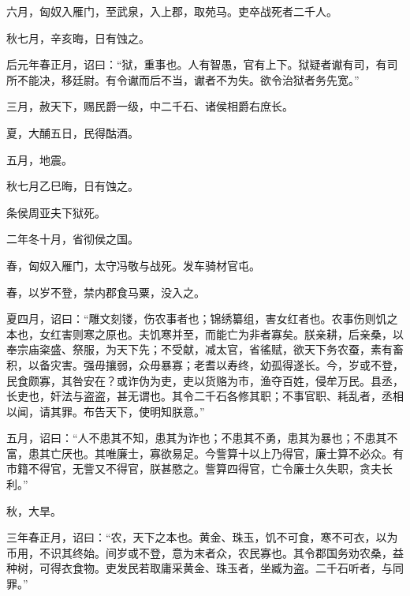 \documentclass[12pt,UTF8]{ctexbook}
\begin{document}
六月，匈奴入雁门，至武泉，入上郡，取苑马。吏卒战死者二千人。



秋七月，辛亥晦，日有蚀之。



后元年春正月，诏曰：“狱，重事也。人有智愚，官有上下。狱疑者谳有司，有司所不能决，移廷尉。有令谳而后不当，谳者不为失。欲令治狱者务先宽。”



三月，赦天下，赐民爵一级，中二千石、诸侯相爵右庶长。



夏，大酺五日，民得酤酒。



五月，地震。



秋七月乙巳晦，日有蚀之。



条侯周亚夫下狱死。



二年冬十月，省彻侯之国。



春，匈奴入雁门，太守冯敬与战死。发车骑材官屯。



春，以岁不登，禁内郡食马粟，没入之。



夏四月，诏曰：“雕文刻镂，伤农事者也；锦绣纂组，害女红者也。农事伤则饥之本也，女红害则寒之原也。夫饥寒并至，而能亡为非者寡矣。朕亲耕，后亲桑，以奉宗庙粢盛、祭服，为天下先；不受献，减太官，省徭赋，欲天下务农蚕，素有畜积，以备灾害。强毋攘弱，众毋暴寡；老耆以寿终，幼孤得遂长。今，岁或不登，民食颇寡，其咎安在？或诈伪为吏，吏以货赂为市，渔夺百姓，侵牟万民。县丞，长吏也，奸法与盗盗，甚无谓也。其令二千石各修其职；不事官职、耗乱者，丞相以闻，请其罪。布告天下，使明知朕意。”



五月，诏曰：“人不患其不知，患其为诈也；不患其不勇，患其为暴也；不患其不富，患其亡厌也。其唯廉士，寡欲易足。今訾算十以上乃得官，廉士算不必众。有市籍不得官，无訾又不得官，朕甚愍之。訾算四得官，亡令廉士久失职，贪夫长利。”



秋，大旱。



三年春正月，诏曰：“农，天下之本也。黄金、珠玉，饥不可食，寒不可衣，以为币用，不识其终始。间岁或不登，意为末者众，农民寡也。其令郡国务劝农桑，益种树，可得衣食物。吏发民若取庸采黄金、珠玉者，坐臧为盗。二千石听者，与同罪。”
\end{document}
